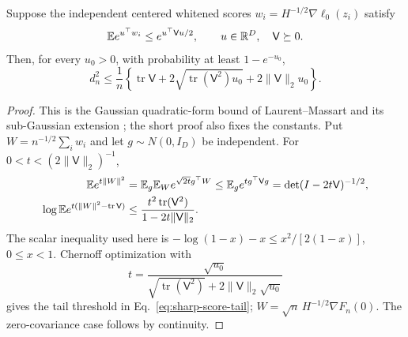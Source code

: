 \begin{lemma}
\label{lem:sharp-quadratic-tail}
Suppose the independent centered whitened scores
$w_i=H^{-1/2}\nabla\ell_0(z_i)$ satisfy
\begin{equation}
\mathbb E e^{u^\top w_i}\leq e^{u^\top\mathsf V u/2},
\qquad u\in\mathbb R^D,\quad\mathsf V\succeq0 .
\end{equation}
Then, for every $u_0>0$, with probability at least $1-e^{-u_0}$,
\begin{equation}
d_n^2\leq\frac1n
\left\{\operatorname{tr}\mathsf V
+2\sqrt{\operatorname{tr}(\mathsf V^2)u_0}
+2\|\mathsf V\|_2u_0\right\}.
\label{eq:sharp-score-tail}
\end{equation}
\end{lemma}
\begin{proof}
This is the Gaussian quadratic-form bound of
Laurent--Massart \cite{laurent2000adaptive} and its sub-Gaussian
extension \cite{hsu2012tail}; the short proof also fixes the constants.
Put $W=n^{-1/2}\sum_iw_i$ and let $g\sim N(0,I_D)$ be independent.
For $0<t<(2\|\mathsf V\|_2)^{-1}$,
\begin{align}
\mathbb E e^{t\|W\|^2}
&=\mathbb E_g\mathbb E_W e^{\sqrt{2t}g^\top W}
\leq\mathbb E_g e^{t g^\top\mathsf Vg}
=\det(I-2t\mathsf V)^{-1/2},\\
\log\mathbb E e^{t(\|W\|^2-\operatorname{tr}\mathsf V)}
&\leq\frac{t^2\operatorname{tr}(\mathsf V^2)}
{1-2t\|\mathsf V\|_2}.
\end{align}
The scalar inequality used here is
$-\log(1-x)-x\leq x^2/[2(1-x)]$, $0\leq x<1$.
Chernoff optimization with
\begin{equation}
t=\frac{\sqrt{u_0}}
{\sqrt{\operatorname{tr}(\mathsf V^2)}
+2\|\mathsf V\|_2\sqrt{u_0}}
\end{equation}
gives the tail threshold in Eq.~\eqref{eq:sharp-score-tail};
$W=\sqrt n\,H^{-1/2}\nabla F_n(0)$.
The zero-covariance case follows by continuity.
\end{proof}


